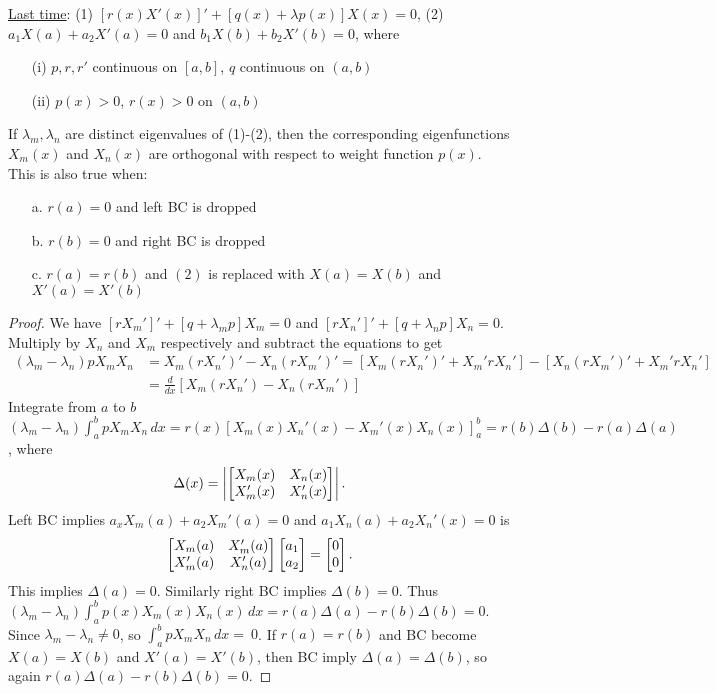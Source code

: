 \documentclass[]{article}
\begin{document}
\underline{Last time}: (1) $[r(x)X'(x)]' + [q(x)+\lambda p(x)]X(x) = 0$, (2) $a_1 X(a) + a_2 X'(a) = 0$ and $b_1 X(b) + b_2 X'(b) = 0$, where
\begin{enumerate}
	\item[(i)] $p,r,r'$ continuous on $[a,b]$, $q$ continuous on $(a,b)$
	\item[(ii)] $p(x)>0$, $r(x)>0$ on $(a,b)$
\end{enumerate}
\begin{recall}
	 If $\lambda_m,\lambda_n$ are distinct eigenvalues of (1)-(2), then the corresponding eigenfunctions $X_m(x)$ and $X_n(x)$ are orthogonal with respect to weight function $p(x)$.
	This is also true when:
	\begin{enumerate}
		\item[a.] $r(a) = 0$ and left BC is dropped
		\item[b.] $r(b) = 0$ and right BC is dropped
		\item[c.] $r(a) = r(b)$ and $(2)$ is replaced with $X(a) = X(b)$ and $X'(a) = X'(b)$
	\end{enumerate}
\end{recall}
\begin{proof}
	We have $[rX_m']' + [q+\lambda_m p]X_m = 0$ and	$[rX_n']' + [q+\lambda_n p] X_n = 0$. Multiply by $X_n$ and $X_m$ respectively and subtract the equations to get 
	\begin{align*}
	(\lambda_m - \lambda_n) p X_m X_n &= X_m (rX_n')' - X_n (rX_m')' = [ X_m (rX_n')' + X_m' r X_n'] - [X_n (rX_m')' + X_m' r X_n'] \\
	&= \frac{d}{dx} [X_m (r X_n') - X_n ( r X_m')]
	\end{align*}
	Integrate from $a$ to $b$
	$(\lambda_m - \lambda_n) \int_a^b p X_m X_n \, dx = r(x) \left[ X_m(x) X_n'(x) - X_m'(x) X_n(x) \right]_a^b = r(b) \Delta(b) - r(a) \Delta(a)$,
	where $$\Delta(x) = \left| \begin{bmatrix}X_m(x) & X_n(x) \\ X_m'(x) & X_n'(x)\end{bmatrix} \right|.$$ Left BC implies $a_x X_m(a) + a_2 X_m'(a) = 0$ and $a_1 X_n(a) + a_2 X_n'(x) = 0$ is $$\begin{bmatrix} X_m(a) & X_m'(a) \\ X_m'(a) & X_n'(a) \end{bmatrix} \begin{bmatrix} a_1 \\ a_2\end{bmatrix} = \begin{bmatrix}0 \\ 0\end{bmatrix}.$$ This implies $\Delta(a) = 0$. Similarly right BC implies $\Delta(b) = 0$. Thus $(\lambda_m - \lambda_n) \int_a^b p(x) X_m(x) X_n(x) \, dx = r(a) \Delta(a) - r(b) \Delta(b) = 0$. Since $\lambda_m - \lambda_n \neq 0$, so $\int_a^b p X_m X_n \, dx =~0$.
	If $r(a) = r(b)$ and BC become $X(a) = X(b)$ and $X'(a)= X'(b)$, then BC imply $\Delta(a) = \Delta(b)$, so again $r(a) \Delta(a) - r(b) \Delta(b) = 0$.
\end{proof}
\end{document}

